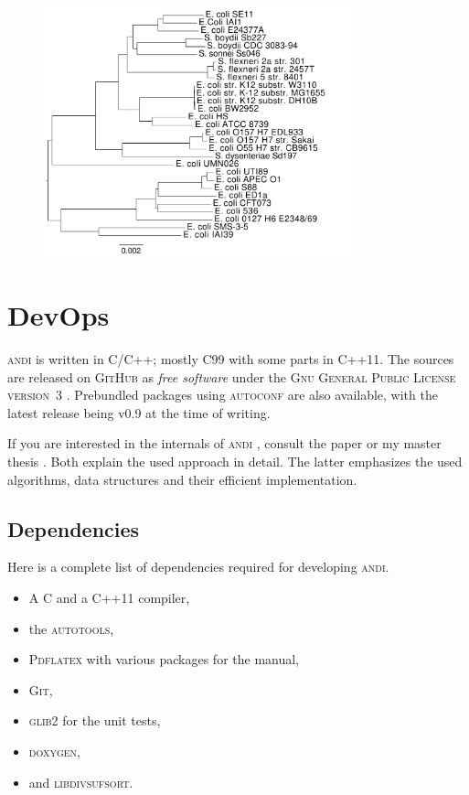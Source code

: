 \documentclass[a4paper,
  10pt,
  english,
  DIV=12,
  BCOR=8mm]{scrbook}
\newcommand{\algo}[1]{\textsc{{#1}}}
\newcommand{\andi}{\algo{andi} }
\begin{document}
\begin{figure}[h]
  \centering\includegraphics[width=0.8\textwidth]{andi_labels.pdf}
\end{figure}




\chapter{DevOps} %

\andi is written in C/C++; mostly C99 with some parts in C++11. The sources are released on \algo{GitHub} as \emph{free software} under the \textsc{Gnu General Public License version~3} \cite{GPL}. Prebundled packages using \algo{autoconf} are also available, with the latest release being {v0.9} at the time of writing.

If you are interested in the internals of \andi, consult the paper \cite{andi} or my master thesis \cite{kloetzl}. Both explain the used approach in detail. The latter emphasizes the used algorithms, data structures and their efficient implementation.

\section{Dependencies}

Here is a complete list of dependencies required for developing \algo{andi}.

\begin{itemize}
  \item A C and a C++11 compiler,
  \item the \algo{autotools},
  \item \algo{Pdflatex} with various packages for the manual,
  \item \algo{Git},
  \item \algo{glib2} for the unit tests,
  \item \algo{doxygen},
  \item and \algo{libdivsufsort}.
\end{itemize}
\end{document}

